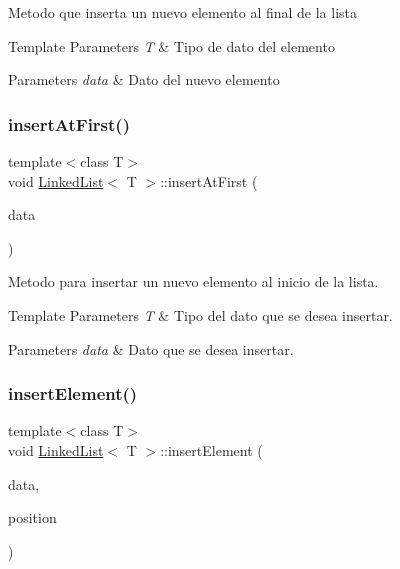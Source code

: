 Metodo que inserta un nuevo elemento al final de la lista 
\begin{DoxyTemplParams}{Template Parameters}
{\em T} & Tipo de dato del elemento \\
\hline
\end{DoxyTemplParams}

\begin{DoxyParams}{Parameters}
{\em data} & Dato del nuevo elemento \\
\hline
\end{DoxyParams}
\mbox{\label{classLinkedList_ab32c4f12170674c0193c94786655a981}} 
\subsubsection{\texorpdfstring{insert\+At\+First()}{insertAtFirst()}}
{\footnotesize\ttfamily template$<$class T$>$ \\
void \hyperlink{classLinkedList}{Linked\+List}$<$ T $>$\+::insert\+At\+First (\begin{DoxyParamCaption}\item[{T}]{data }\end{DoxyParamCaption})\hspace{0.3cm}{\ttfamily [inline]}}

Metodo para insertar un nuevo elemento al inicio de la lista. 
\begin{DoxyTemplParams}{Template Parameters}
{\em T} & Tipo del dato que se desea insertar. \\
\hline
\end{DoxyTemplParams}

\begin{DoxyParams}{Parameters}
{\em data} & Dato que se desea insertar. \\
\hline
\end{DoxyParams}
\mbox{\label{classLinkedList_a7e21e5e9c204d433465d6e886f365e87}} 
\subsubsection{\texorpdfstring{insert\+Element()}{insertElement()}}
{\footnotesize\ttfamily template$<$class T$>$ \\
void \hyperlink{classLinkedList}{Linked\+List}$<$ T $>$\+::insert\+Element (\begin{DoxyParamCaption}\item[{T}]{data,  }\item[{int}]{position }\end{DoxyParamCaption})\hspace{0.3cm}{\ttfamily [inline]}}

